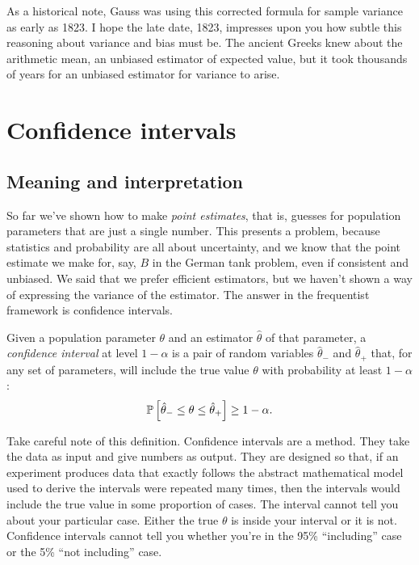 As a historical note, Gauss was using this corrected formula for sample
variance as early as 1823. I hope the late date, 1823, impresses upon you how
subtle this reasoning about variance and bias must be. The ancient Greeks knew
about the arithmetic mean, an unbiased estimator of expected value, but it took
thousands of years for an unbiased estimator for variance to arise.

\section{Confidence intervals}

\subsection{Meaning and interpretation}

So far we've shown how to make \emph{point estimates}, that is, guesses for
population parameters that are just a single number. This presents a problem,
because statistics and probability are all about uncertainty, and we know that
the point estimate we make for, say, $B$ in the German tank problem, even if
consistent and unbiased. We said that we prefer efficient estimators, but we
haven't shown a way of expressing the variance of the estimator. The answer in
the frequentist framework is confidence intervals.

Given a population parameter $\theta$ and an estimator $\hat{\theta}$ of that
parameter, a \emph{confidence interval} at level $1 - \alpha$ is a pair of
random variables $\hat{\theta}_-$ and $\hat{\theta}_+$ that, for any set of
parameters, will include the true value $\theta$ with probability at least
$1-\alpha$:
\begin{equation}
  \mathbb{P}\left[{\hat{\theta}_- \leq \theta \leq \hat{\theta}_+}\right] \geq 1 - \alpha.
\end{equation}

Take careful note of this definition. Confidence intervals are a method. They
take the data as input and give numbers as output. They are designed so that,
if an experiment produces data that exactly follows the abstract mathematical
model used to derive the intervals were repeated many times, then the
intervals would include the true value in some proportion of cases. The
interval cannot tell you about your particular case. Either the true $\theta$
is inside your interval or it is not. Confidence intervals cannot tell you
whether you're in the 95\% ``including'' case or the 5\% ``not including''
case.

